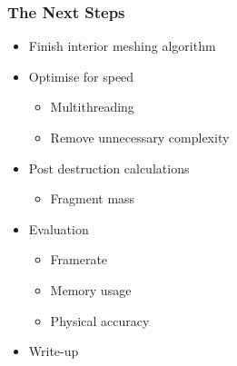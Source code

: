 \documentclass{beamer}
\begin{document}
	\begin{frame}
	\frametitle{The Next Steps}	
		\begin{itemize}
		\item{Finish interior meshing algorithm}
		\item{Optimise for speed}
			\begin{itemize}
				\item{Multithreading}
				\item{Remove unnecessary complexity}
			\end{itemize}
		\item{Post destruction calculations}
			\begin{itemize}
				\item{Fragment mass}
			\end{itemize}
		\item{Evaluation}
			\begin{itemize}
				\item{Framerate}
				\item{Memory usage}
				\item{Physical accuracy}
			\end{itemize}
		\item{Write-up}
		\end{itemize}
	\end{frame}
\end{document}
